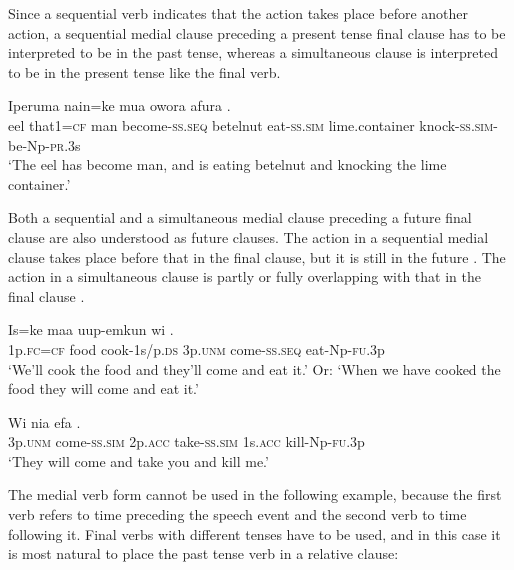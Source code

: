 Since a sequential verb indicates that the action takes place before another action, a sequential medial clause preceding a present tense final clause has to be interpreted to be in the past tense, whereas a simultaneous clause is interpreted to be in the present tense like the final verb.

\ea%
\label{ex:3:x1024}
\gll Iperuma nain=ke mua  owora  afura .\\
eel that1=\textsc{cf} man become-\textsc{ss}.\textsc{seq} betelnut eat-\textsc{ss}.\textsc{sim} lime.container knock-\textsc{ss}.\textsc{sim}-be-Np-\textsc{pr}.3s\\
\glt`The eel has become man, and is eating betelnut and knocking the lime container.'
\z

Both a sequential and a simultaneous medial clause preceding a future final clause are also understood as future clauses. The action in a sequential medial clause takes place before that in the final clause, but it is still in the future . The action in a simultaneous clause is partly or fully overlapping with that in the final clause .

\ea%
\label{ex:3:x1026}
\gll Is=ke maa uup-emkun wi  . \\
1p.\textsc{fc}=\textsc{cf} food cook-1s/p.\textsc{ds} 3p.\textsc{unm} come-\textsc{ss}.\textsc{seq} eat-Np-\textsc{fu}.3p\\
\glt`We'll cook the food and they'll come and eat it.' Or: `When we have cooked the food they will come and eat it.'
\z

\ea%
\label{ex:3:x1027}
\gll Wi  nia  efa . \\
3p.\textsc{unm} come-\textsc{ss}.\textsc{sim} 2p.\textsc{acc} take-\textsc{ss}.\textsc{sim} 1s.\textsc{acc} kill-Np-\textsc{fu}.3p\\
\glt`They will come and take you and kill me.'
\z

The medial verb form cannot be used in the following example, because the first verb refers to time preceding the speech event and the second verb to time following it. Final verbs with different tenses have to be used, and in this case it is most natural to place the past tense verb in a relative clause: 

